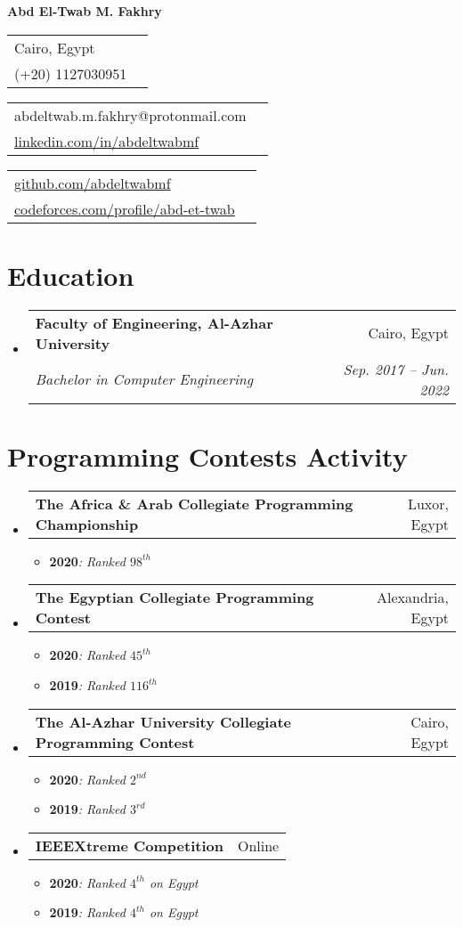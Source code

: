 \documentclass[letterpaper, 11pt]{article}
\makeatletter
\newcommand{\cItem}[2]{\item\small{\textbf{#1}{\textit{#2} \vspace{-2pt}}}}
\newcommand{\SubSecListBeg}{\begin{itemize}[leftmargin=*]}
\newcommand{\SubSecListEnd}{\end{itemize}}
\newcommand{\ItemListBeg}{\begin{itemize}}
\newcommand{\ItemListEnd}{\end{itemize}\vspace{-5pt}}
\newcommand{\subsecfourtwoitalic}[4] {
	\vspace{-1pt}\item
	\begin{tabular*}{0.97\textwidth}[t]{l@{\extracolsep{\fill}}r}
		\textbf{#1} & #2 \\
		\textit{\small#3} & \textit{\small #4} \\
	\end{tabular*}\vspace{-5pt}
}
\newcommand{\subsectwonormal}[2] {
	\vspace{-1pt}\item
	\begin{tabular*}{0.97\textwidth}[t]{l@{\extracolsep{\fill}}r}
		\textbf{#1} & #2 \\
	\end{tabular*}\vspace{-5pt}
}
\newcommand{\linktable}[4] {
	\begin{tabular}{lr}
	#1 #2 \\
	#3 #4 \\
	\end{tabular}
}
\makeatother
\begin{document}
\textbf{\Huge Abd El-Twab M. Fakhry} \\

\begin{minipage}[t]{0.10\textwidth}
	\linktable
	{\faIcon{location-arrow}} {Cairo, Egypt}
	{\faIcon{mobile-alt}}     {(+20) 1127030951}
\end{minipage}
\hfill
\begin{minipage}[t]{0.20\textwidth}
	\linktable
	{\faIcon{envelope}} {abdeltwab.m.fakhry@protonmail.com}
	{\faIcon{linkedin}} {\href{https://www.linkedin.com/in/abdeltwabmf/}{linkedin.com/in/abdeltwabmf}}
\end{minipage}
\hfill
\begin{minipage}[t]{0.35\textwidth}
	\linktable
	{\faIcon{github}} {\href{https://github.com/AbdeltwabMF}{github.com/abdeltwabmf}}
	{\faIcon{code}}   {\href{https://codeforces.com/profile/Abd-Et-Twab}{codeforces.com/profile/abd-et-twab}}
\end{minipage}


\section{Education}
\SubSecListBeg
	\subsecfourtwoitalic
	{\faIcon{university} Faculty of Engineering, Al-Azhar University} {Cairo, Egypt}
	{Bachelor in Computer Engineering}                                {Sep. 2017 -- Jun. 2022}
\SubSecListEnd

\section{Programming Contests Activity}
\SubSecListBeg
	\subsectwonormal
	{The Africa \& Arab Collegiate Programming Championship}{Luxor, Egypt}
	\ItemListBeg
		\cItem
		{2020}{: Ranked $98^{th}$}
	\ItemListEnd
	\subsectwonormal
	{The Egyptian Collegiate Programming Contest}{Alexandria, Egypt}
	\ItemListBeg
		\cItem
		{2020}{: Ranked $45^{th}$}
		\cItem
		{2019}{: Ranked $116^{th}$}
	\ItemListEnd
	\subsectwonormal
	{The Al-Azhar University Collegiate Programming Contest}{Cairo, Egypt}
	\ItemListBeg
		\cItem
		{2020}{: Ranked $2^{nd}$}
		\cItem
		{2019}{: Ranked $3^{rd}$}
	\ItemListEnd
	\subsectwonormal
	{IEEEXtreme Competition}{Online}
	\ItemListBeg
		\cItem
		{2020}{: Ranked $4^{th}$ on Egypt}
		\cItem
		{2019}{: Ranked $4^{th}$ on Egypt}
	\ItemListEnd
\SubSecListEnd


\end{document}

